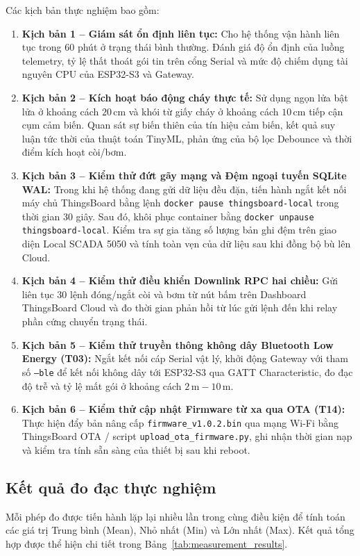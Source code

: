 Các kịch bản thực nghiệm bao gồm:
\begin{enumerate}
    \item \textbf{Kịch bản 1 -- Giám sát ổn định liên tục:} Cho hệ thống vận hành liên tục trong 60 phút ở trạng thái bình thường. Đánh giá độ ổn định của luồng telemetry, tỷ lệ thất thoát gói tin trên cổng Serial và mức độ chiếm dụng tài nguyên CPU của ESP32-S3 và Gateway.
    \item \textbf{Kịch bản 2 -- Kích hoạt báo động cháy thực tế:} 
    Sử dụng ngọn lửa bật lửa ở khoảng cách $20\,\text{cm}$ và khói từ giấy cháy ở khoảng cách $10\,\text{cm}$ tiếp cận cụm cảm biến. Quan sát sự biến thiên của tín hiệu cảm biến, kết quả suy luận tức thời của thuật toán TinyML, phản ứng của bộ lọc Debounce và thời điểm kích hoạt còi/bơm.
    \item \textbf{Kịch bản 3 -- Kiểm thử đứt gãy mạng và Đệm ngoại tuyến SQLite WAL:}
    Trong khi hệ thống đang gửi dữ liệu đều đặn, tiến hành ngắt kết nối máy chủ ThingsBoard bằng lệnh \texttt{docker pause thingsboard-local} trong thời gian 30 giây. Sau đó, khôi phục container bằng \texttt{docker unpause thingsboard-local}. Kiểm tra sự gia tăng số lượng bản ghi đệm trên giao diện Local SCADA 5050 và tính toàn vẹn của dữ liệu sau khi đồng bộ bù lên Cloud.
    \item \textbf{Kịch bản 4 -- Kiểm thử điều khiển Downlink RPC hai chiều:}
    Gửi liên tục 30 lệnh đóng/ngắt còi và bơm từ nút bấm trên Dashboard ThingsBoard Cloud và đo thời gian phản hồi từ lúc gửi lệnh đến khi relay phần cứng chuyển trạng thái.
    \item \textbf{Kịch bản 5 -- Kiểm thử truyền thông không dây Bluetooth Low Energy (T03):}
    Ngắt kết nối cáp Serial vật lý, khởi động Gateway với tham số \texttt{--ble} để kết nối không dây tới ESP32-S3 qua GATT Characteristic, đo đạc độ trễ và tỷ lệ mất gói ở khoảng cách $2\,\text{m} - 10\,\text{m}$.
    \item \textbf{Kịch bản 6 -- Kiểm thử cập nhật Firmware từ xa qua OTA (T14):}
    Thực hiện đẩy bản nâng cấp \texttt{firmware\_v1.0.2.bin} qua mạng Wi-Fi bằng ThingsBoard OTA / script \texttt{upload\_ota\_firmware.py}, ghi nhận thời gian nạp và kiểm tra tính sẵn sàng của thiết bị sau khi reboot.
\end{enumerate}

\subsection{Kết quả đo đạc thực nghiệm}
Mỗi phép đo được tiến hành lặp lại nhiều lần trong cùng điều kiện để tính toán các giá trị Trung bình (Mean), Nhỏ nhất (Min) và Lớn nhất (Max). Kết quả tổng hợp được thể hiện chi tiết trong Bảng~\ref{tab:measurement_results}.

